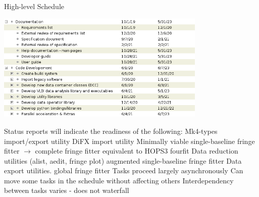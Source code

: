 \documentclass[8pt]{beamer}
\begin{document}
\begin{frame}{High-level Schedule}

    \centering
    \includegraphics[width=0.75\textwidth]{sched.png}
    \begin{outline}
    \1 Status reports will indicate the readiness of the following:
        \2 Mk4-types import/export utility
        \2 DiFX import utility
        \2 Minimally viable single-baseline fringe fitter $\rightarrow$ complete fringe fitter equivalent to HOPS3 fourfit
        \2 Data reduction utilities (alist, aedit, fringe plot)
        \2 augmented single-baseline fringe fitter 
        \2 Data export utilities.
        \2 global fringe fitter
    \1 Tasks proceed largely asynchronously
        \2 Can move some tasks in the schedule without affecting others
        \2 Interdependency between tasks varies - does not waterfall
    \end{outline}
\end{frame}
\end{document}
